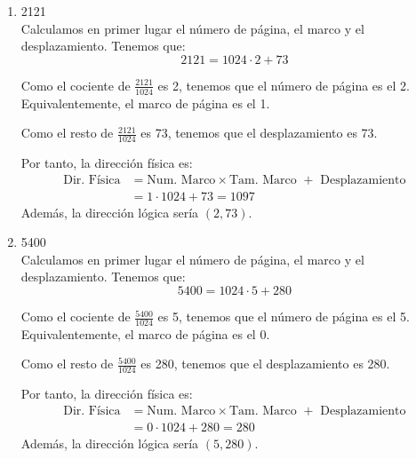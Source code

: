 \begin{ejercicio}
\begin{enumerate}
        \item 2121\\
        Calculamos en primer lugar el número de página, el marco y el desplazamiento. Tenemos que:
        \begin{equation*}
            2121=1024\cdot 2 + 73
        \end{equation*}

        Como el cociente de $\frac{2121}{1024}$ es 2, tenemos que el número de página es el 2. Equivalentemente, el marco de página es el 1.

        Como el resto de $\frac{2121}{1024}$ es 73, tenemos que el desplazamiento es 73.

        Por tanto, la dirección física es:
        \begin{equation*}\begin{split}
            \text{Dir. Física} &= \text{Num. Marco}\times\text{Tam. Marco } + \text{ Desplazamiento}
            \\
            &= 1\cdot 1024 + 73 = 1097
        \end{split}\end{equation*}
        Además, la dirección lógica sería $(2,73)$.
        
        \item 5400\\
        Calculamos en primer lugar el número de página, el marco y el desplazamiento. Tenemos que:
        \begin{equation*}
            5400=1024\cdot 5 + 280
        \end{equation*}

        Como el cociente de $\frac{5400}{1024}$ es 5, tenemos que el número de página es el 5. Equivalentemente, el marco de página es el 0.

        Como el resto de $\frac{5400}{1024}$ es 280, tenemos que el desplazamiento es 280.

        Por tanto, la dirección física es:
        \begin{equation*}\begin{split}
            \text{Dir. Física} &= \text{Num. Marco}\times\text{Tam. Marco } + \text{ Desplazamiento}
            \\
            &= 0\cdot 1024 + 280 = 280
        \end{split}\end{equation*}
        Además, la dirección lógica sería $(5,280)$.
        
    \end{enumerate}
\end{ejercicio}

